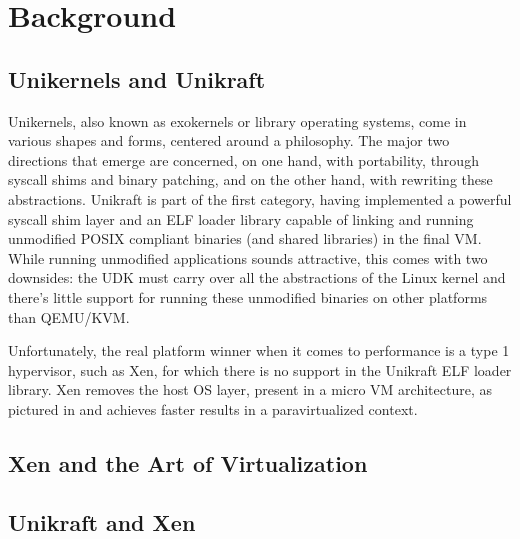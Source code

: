 \chapter{Background}
\label{chapter:background}

\section{Unikernels and Unikraft}
\label{sec:unikernels-unikraft}

Unikernels, also known as exokernels or library operating systems, come in various shapes and forms, centered around a philosophy.
The major two directions that emerge are concerned, on one hand, with portability, through syscall shims and binary patching, and on the other hand, with rewriting these abstractions.
Unikraft is part of the first category, having implemented a powerful syscall shim layer and an ELF loader library capable of linking and running unmodified POSIX compliant binaries (and shared libraries) in the final VM.
While running unmodified applications sounds attractive, this comes with two downsides: the UDK must carry over all the abstractions of the Linux kernel and there's little support for running these unmodified binaries on other platforms than QEMU/KVM.

Unfortunately, the real platform winner when it comes to performance is a type 1 hypervisor, such as Xen, for which there is no support in the Unikraft ELF loader library.
Xen removes the host OS layer, present in a micro VM architecture, as pictured in  and achieves faster results in a paravirtualized context.


\section{Xen and the Art of Virtualization}
\label{sec:xen}

\section{Unikraft and Xen}
\label{sec:unikraft-xen}



